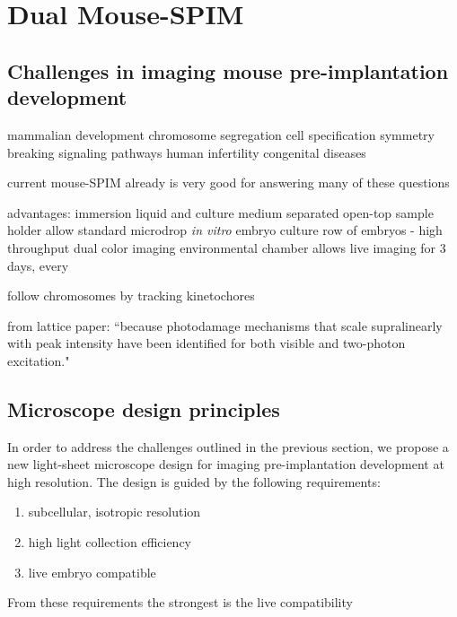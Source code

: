 

\chapter{Dual Mouse-SPIM}

\graphicspath{{./figures/2_DualMouse/}}

\section{Challenges in imaging mouse pre-implantation development}
  mammalian development
  chromosome segregation
  cell specification
  symmetry breaking
  signaling pathways
  human infertility
  congenital diseases 

  current mouse-SPIM \cite{strnad_inverted_2016} already is very good for answering many of these questions

  advantages:
    immersion liquid and culture medium separated
    open-top sample holder allow standard microdrop \textit{in vitro} embryo culture
    row of embryos - high throughput
    dual color imaging
    environmental chamber allows live imaging for 3 days, every 

  follow chromosomes by tracking kinetochores

  from lattice paper: ``because photodamage mechanisms that scale supralinearly with peak intensity have been identified for both visible \cite{donnert_major_2007} and two-photon \cite{ji_high-speed_2008} excitation."



\section{Microscope design principles}
  In order to address the challenges outlined in the previous section, we propose a new light-sheet microscope design for imaging pre-implantation development at high resolution. The design is guided by the following requirements:
  \begin{enumerate}
    \item subcellular, isotropic resolution
    \item high light collection efficiency
    \item live embryo compatible
  \end{enumerate}
  From these requirements the strongest is the live compatibility

